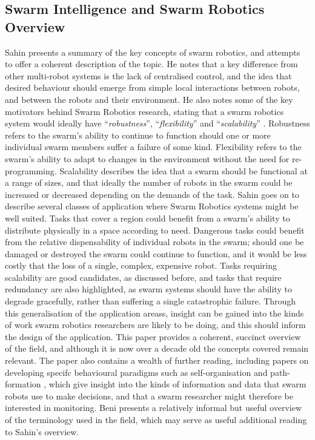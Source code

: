 \documentclass[titlepage,hidelinks,10pt]{article}
\begin{document}
\subsection{Swarm Intelligence and Swarm Robotics Overview} \label{GeneralSR}
Sahin \cite{InspirationToApplication} presents a summary of the key concepts of swarm robotics, and attempts to offer a coherent description of the topic. He notes that a key difference from other multi-robot systems is the lack of centralised control, and the idea that desired behaviour should emerge from simple local interactions between robots, and between the robots and their environment. He also notes some of the key motivators behind Swarm Robotics research, stating that a swarm robotics system would ideally have ``\textit{robustness}'', ``\textit{flexibility}'' and ``\textit{scalability}'' \cite{InspirationToApplication}. Robustness refers to the swarm's ability to continue to function should one or more individual swarm members suffer a failure of some kind. Flexibility refers to the swarm's ability to adapt to changes in the environment without the need for re-programming. Scalability describes the idea that a swarm should be functional at a range of sizes, and that ideally the number of robots in the swarm could be increased or decreased depending on the demands of the task. Sahin \cite{InspirationToApplication} goes on to describe several classes of application where Swarm Robotics systems might be well suited. Tasks that cover a region could benefit from a swarm's ability to distribute physically in a space according to need. Dangerous tasks could benefit from the relative dispensability of individual robots in the swarm; should one be damaged or destroyed the swarm could continue to function, and it would be less costly that the loss of a single, complex, expensive robot. Tasks requiring scalability are good candidates, as discussed before, and tasks that require redundancy are also highlighted, as swarm systems should have the ability to degrade gracefully, rather than suffering a single catastrophic failure. Through this generalisation of the application areass, insight can be gained into the kinds of work swarm robotics researchers are likely to be doing, and this should inform the design of the application. This paper \cite{InspirationToApplication} provides a coherent, succinct overview of the field, and although it is now over a decade old the concepts covered remain relevant. The paper also contains a wealth of further reading, including papers on developing specifc behavioural paradigms such as self-organisation \cite{SelfOrganizing} and path-formation \cite{PathFormation}, which give insight into the kinds of information and data that swarm robots use to make decisions, and that a swarm researcher might therefore be interested in monitoring. Beni \cite{FromSIToSR} presents a relatively informal but useful overview of the terminology used in the field, which may serve as useful additional reading to Sahin's overview.
\end{document}
